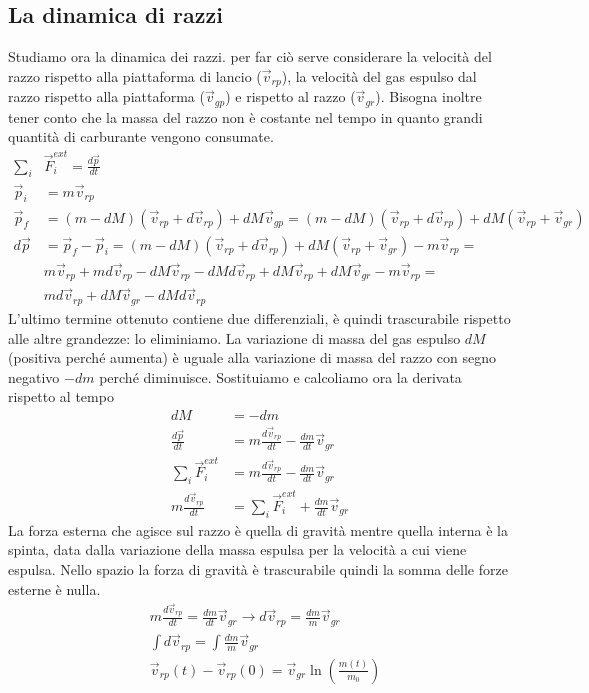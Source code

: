 \documentclass[10pt,a4paper]{article}
\begin{document}
\subsection{La dinamica di razzi}
Studiamo ora la dinamica dei razzi. per far ciò serve considerare la velocità del razzo rispetto alla piattaforma di lancio ($\vec{v}_{rp}$), la velocità del gas espulso dal razzo rispetto alla piattaforma ($\vec{v}_{gp}$) e rispetto al razzo ($\vec{v}_{gr}$). Bisogna inoltre tener conto che la massa del razzo non è costante nel tempo in quanto grandi quantità di carburante vengono consumate. 
\begin{align*}
	\sum_i &\vec{F}_i^{ext} = \frac{d\vec{p}}{dt}\\
	\vec{p}_i &= m \vec{v}_{rp}\\
	\vec{p}_f &= (m - dM) (\vec{v}_{rp}+d\vec{v}_{rp})+dM\vec{v}_{gp} = (m - dM) (\vec{v}_{rp}+d\vec{v}_{rp})+dM(\vec{v}_{rp}+\vec{v}_{gr})\\
	d\vec{p} &= \vec{p}_f - \vec{p}_i = (m - dM) (\vec{v}_{rp}+d\vec{v}_{rp})+dM(\vec{v}_{rp}+\vec{v}_{gr}) - m \vec{v}_{rp}=\\
	&m \vec{v}_{rp}+md\vec{v}_{rp}-dM \vec{v}_{rp}-dM d\vec{v}_{rp}+dM \vec{v}_{rp} + dM \vec{v}_{gr}-m\vec{v}_{rp}=\\ 
	&m d\vec{v}_{rp}+dM \vec{v}_{gr}-dM d\vec{v}_{rp}
\end{align*}
L'ultimo termine ottenuto contiene due differenziali, è quindi trascurabile rispetto alle altre grandezze: lo eliminiamo. La variazione di massa del gas espulso $dM$ (positiva perché aumenta) è uguale alla variazione di massa del razzo con segno negativo $-dm$ perché diminuisce. Sostituiamo e calcoliamo ora la derivata rispetto al tempo 
\begin{align*}
	dM &= -dm\\
	\frac{d\vec{p}}{dt} &= m \frac{d\vec{v}_{rp}}{dt} - \frac{dm}{dt} \vec{v}_{gr}\\
	\sum_i \vec{F}_i^{ext} &= m \frac{d\vec{v}_{rp}}{dt} - \frac{dm}{dt} \vec{v}_{gr}\\
	m \frac{d\vec{v}_{rp}}{dt} &= 	\sum_i \vec{F}_i^{ext} + \frac{dm}{dt} \vec{v}_{gr}
\end{align*}
La forza esterna che agisce sul razzo è quella di gravità mentre quella interna è la spinta, data dalla variazione della massa espulsa per la velocità a cui viene espulsa. Nello spazio la forza di gravità è trascurabile quindi la somma delle forze esterne è nulla.
\begin{align*}
	&m \frac{d\vec{v}_{rp}}{dt} = \frac{dm}{dt}\vec{v}_{gr} \rightarrow d\vec{v}_{rp} = \frac{dm}{m} \vec{v}_{gr}\\
	&\int d\vec{v}_{rp} = \int \frac{dm}{m} \vec{v}_{gr}\\
	&\vec{v}_{rp}(t)-\vec{v}_{rp}(0) = \vec{v}_{gr} \ln(\frac{m(t)}{m_0})
\end{align*}
\end{document}

